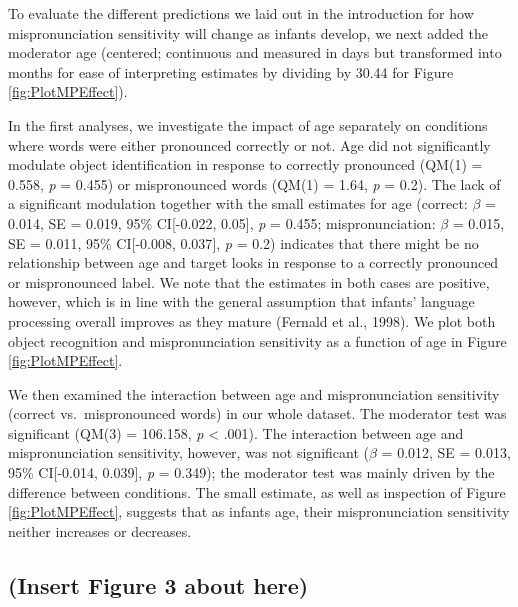 \documentclass[man]{apa6}
\theoremstyle{definition}
\theoremstyle{definition}
\theoremstyle{definition}
\theoremstyle{remark}
\begin{document}
To evaluate the different predictions we laid out in the introduction
for how mispronunciation sensitivity will change as infants develop, we
next added the moderator age (centered; continuous and measured in days
but transformed into months for ease of interpreting estimates by
dividing by 30.44 for Figure \ref{fig:PlotMPEffect}).

In the first analyses, we investigate the impact of age separately on
conditions where words were either pronounced correctly or not. Age did
not significantly modulate object identification in response to
correctly pronounced (QM(1) = 0.558, \emph{p} = 0.455) or mispronounced
words (QM(1) = 1.64, \emph{p} = 0.2). The lack of a significant
modulation together with the small estimates for age (correct: \(\beta\)
= 0.014, SE = 0.019, 95\% CI{[}-0.022, 0.05{]}, \emph{p} = 0.455;
mispronunciation: \(\beta\) = 0.015, SE = 0.011, 95\% CI{[}-0.008,
0.037{]}, \emph{p} = 0.2) indicates that there might be no relationship
between age and target looks in response to a correctly pronounced or
mispronounced label. We note that the estimates in both cases are
positive, however, which is in line with the general assumption that
infants' language processing overall improves as they mature (Fernald et
al., 1998). We plot both object recognition and mispronunciation
sensitivity as a function of age in Figure \ref{fig:PlotMPEffect}.

We then examined the interaction between age and mispronunciation
sensitivity (correct vs.~mispronounced words) in our whole dataset. The
moderator test was significant (QM(3) = 106.158, \emph{p} \textless{}
.001). The interaction between age and mispronunciation sensitivity,
however, was not significant (\(\beta\) = 0.012, SE = 0.013, 95\%
CI{[}-0.014, 0.039{]}, \emph{p} = 0.349); the moderator test was mainly
driven by the difference between conditions. The small estimate, as well
as inspection of Figure \ref{fig:PlotMPEffect}, suggests that as infants
age, their mispronunciation sensitivity neither increases or decreases.

\subsection{(Insert Figure 3 about
here)}\label{insert-figure-3-about-here}
\end{document}

